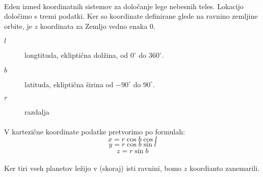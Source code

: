 \documentclass[a4paper, 12pt]{article}
\begin{document}
	\paragraph{}
	Eden izmed koordinatnih sistemov za določanje lege nebesnih teles. Lokacijo določimo s tremi podatki. Ker so koordinate definirane glede na ravnino zemljine orbite, je $z$ koordinata za Zemljo vedno enaka 0.
	\begin{description}
		\item[$l$] longtituda, ekliptična dolžina, od $0^\circ$ do $360^\circ$.
		\item[$b$] latituda, ekliptična širina od $-90^\circ$ do $90^\circ$.
		\item[$r$] razdalja
	\end{description}
	
	\paragraph{}
	V kartezične koordinate podatke pretvorimo po formulah:
	$$x = r \cos b \cos l$$
	$$y = r \cos b \sin l$$
	$$z = r \sin b$$
	
	\paragraph{}
	Ker tiri vseh planetov ležijo v (skoraj) isti ravnini, bomo $z$ koordianto zanemarili.
	
	
\end{document}

